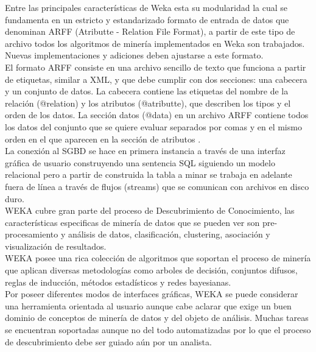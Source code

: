 Entre las principales caracter\'isticas de Weka esta su modularidad la cual se fundamenta en un estricto y
estandarizado formato de entrada de datos que denominan ARFF (Atributte - Relation File Format), a partir de este
tipo de archivo todos los algoritmos de miner\'ia implementados en Weka son trabajados.  Nuevas implementaciones y
adiciones deben ajustarse a este formato.\\

El formato ARFF consiste en una archivo sencillo de texto que funciona a partir de etiquetas, similar a XML, y
que debe cumplir con dos secciones: una cabecera y un conjunto de datos.  La cabecera contiene las etiquetas del
nombre de la relaci\'on (@relation) y los atributos (@atributte), que describen los tipos y el orden de los
datos. La secci\'on datos (@data) en un archivo ARFF contiene todos los datos del conjunto que se quiere evaluar
separados por comas y en el mismo orden en el que aparecen en la secci\'on de atributos \cite{arff}.\\

La conexi\'on al SGBD se hace en primera instancia a trav\'es de una interfaz gr\'afica de usuario construyendo
una sentencia SQL siguiendo un modelo relacional pero a partir de construida la tabla a minar se trabaja en
adelante fuera de l\'inea a trav\'es de flujos (streams) que se comunican con archivos en disco duro.\\

WEKA cubre gran parte del proceso de Descubrimiento de Conocimiento, las caracter\'isticas especificas de
miner\'ia de datos que se pueden ver son pre-procesamiento y an\'alisis de datos, clasificaci\'on, clustering,
asociaci\'on y visualizaci\'on de resultados.\\

WEKA posee una rica colecci\'on de algoritmos que soportan el proceso de miner\'ia que aplican diversas
metodolog\'ias como arboles de decisi\'on, conjuntos difusos, reglas de inducci\'on, m\'etodos estad\'isticos y
redes bayesianas.\\

Por poseer diferentes modos de interfaces gr\'aficas, WEKA se puede considerar una herramienta orientada al
usuario aunque cabe aclarar que exige un buen dominio de conceptos de miner\'ia de datos y del objeto de
an\'alisis.  Muchas tareas se encuentran soportadas aunque no del todo automatizadas por lo que el proceso de
descubrimiento debe ser guiado a\'un por un analista.\\

